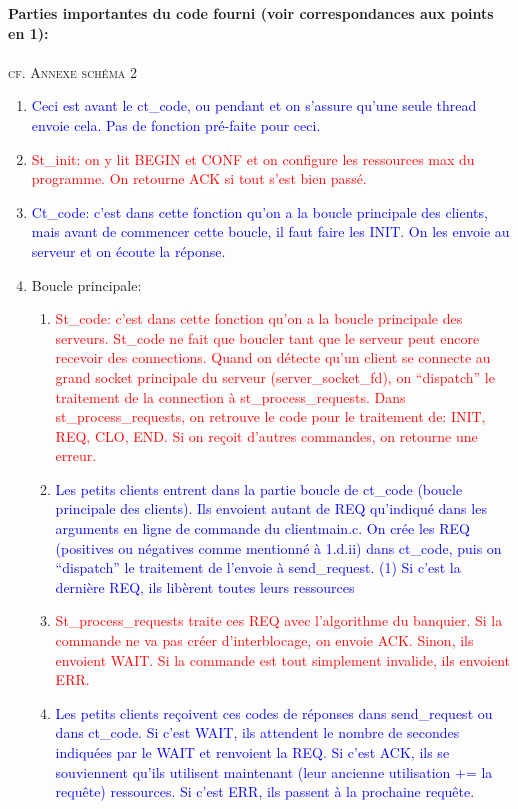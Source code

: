 \documentclass[11pt]{article}
\begin{document}
\textbf{Parties importantes du code fourni (voir correspondances aux points en 1):}
\\\\
\textsc{cf. Annexe schéma 2}
\\

\begin{enumerate}[label=\alph*.]
 \item \textcolor{blue}{Ceci est avant le ct\_code, ou pendant et on s’assure qu’une seule thread envoie cela. Pas de fonction pré-faite pour ceci.}
 \item \textcolor{red}{St\_init: on y lit BEGIN et CONF et on configure les ressources max du programme. On retourne ACK si tout s’est bien passé.}
 \item \textcolor{blue}{Ct\_code: c’est dans cette fonction qu’on a la boucle principale des clients, mais avant de commencer cette boucle, il faut faire les INIT. On les envoie au serveur et on écoute la réponse.}
 \item Boucle principale:
  \begin{enumerate}[label =\roman*.]
   \item \textcolor{red}{St\_code: c’est dans cette fonction qu’on a la boucle principale des serveurs. St\_code ne fait que boucler tant que le serveur peut encore recevoir des connections. 
   Quand on détecte qu’un client se connecte au grand socket principale du serveur (server\_socket\_fd), on “dispatch” le traitement de la connection à st\_process\_requests.
   Dans st\_process\_requests, on retrouve le code pour le traitement de: INIT, REQ, CLO, END. Si on reçoit d’autres commandes, on retourne une erreur.}
   \item \textcolor{blue}{Les petits clients entrent dans la partie boucle de ct\_code (boucle principale des clients). Ils envoient autant de REQ qu’indiqué dans les arguments en ligne de commande du client\/main.c. On crée les REQ (positives ou négatives comme mentionné à 1.d.ii) dans ct\_code, puis on “dispatch” le traitement de l’envoie à send\_request.
   (1) Si c'est la dernière REQ, ils libèrent toutes leurs ressources}
   \item \textcolor{red}{St\_process\_requests traite ces REQ avec l’algorithme du banquier. Si la commande ne va pas créer d’interblocage, on envoie ACK. Sinon, ils envoient WAIT. Si la commande est tout simplement invalide, ils envoient ERR. }
   \item \textcolor{blue}{Les petits clients reçoivent ces codes de réponses dans send\_request ou dans ct\_code. Si c’est WAIT, ils attendent le nombre de secondes indiquées par le WAIT et renvoient la REQ. Si c’est ACK, ils se souviennent qu’ils utilisent maintenant (leur ancienne utilisation += la requête) ressources. Si c’est ERR, ils passent à la prochaine requête.}

\end{enumerate}
\end{enumerate}
\end{document}
